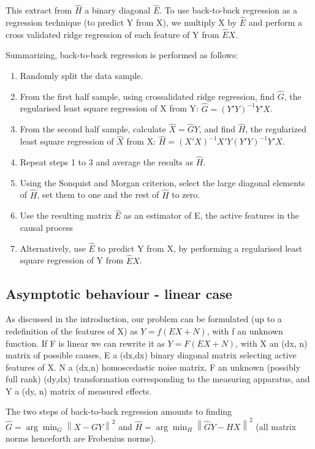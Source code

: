 \documentclass{article}
\begin{document}
This extract from $\hat H$ a binary diagonal $\hat E$.
%
To use back-to-back regression as a regression technique (to predict Y from X), we multiply X by $\hat E$ and perform a cross validated ridge regression of each feature of Y from $\hat E X$.

Summarizing, back-to-back regression is performed as follows:
\begin{enumerate}
\item Randomly split the data sample.
\item From the first half sample, using crossalidated ridge regression, find $\hat G$, the regularised least square regression of X from Y: $\hat G=(Y'Y)^{-1} Y'X$.
\item From the second half sample, calculate $\hat X = \hat G Y$, and find $\hat H$, the regularized least square regression of $\hat X$ from X: $\hat H=(X'X)^{-1} X'Y(Y'Y)^{-1} Y'X$.
\item Repeat steps 1 to 3 and average the results as $\hat H$.
\item Using the Sonquist and Morgan criterion, select the large diagonal elements of $\hat H$, set them to one and the rest of $\hat  H$ to zero.
\item Use the resulting matrix $\hat E$ as an estimator of E, the active features in the causal process
\item Alternatively, use $\hat E$ to predict Y from X, by performing a regularised least square regression of Y from $\hat E X$.
%

\end{enumerate}

\subsection{Asymptotic behaviour - linear case}
As discussed in the introduction, our problem can be formulated (up to a redefinition of the features of X) as $Y=f(EX+N)$, with f an unknown function.
%
If F is linear we can rewrite it as $Y = F(EX + N)$, with X an (dx, n) matrix of possible causes, E a (dx,dx) binary diagonal matrix selecting active features of X.
%
N a (dx,n) homoscedastic noise matrix, F an unknown (possibly full rank) (dy,dx) transformation corresponding to the measuring apparatus, and Y a (dy, n) matrix of measured effects.

The two steps of back-to-back regression amounts to finding $\hat G=\arg \min_G \left \| X-GY \right \|^2$ and $\hat H =\arg \min_H \left \| \hat GY - HX \right \|^2$ (all matrix norms henceforth are Frobenius norms).
\end{document}
